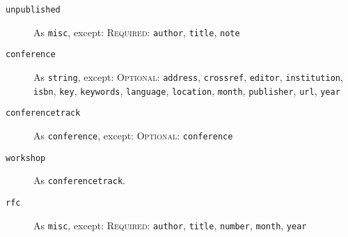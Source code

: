 \documentclass{article}
\begin{document}
\begin{description}
\item[\texttt{unpublished}] As \texttt{misc}, except:
\textsc{Required:} \texttt{author}, \texttt{title}, \texttt{note}

\item[\texttt{conference}] As \texttt{string}, except:
\textsc{Optional:}
\texttt{address},
\texttt{crossref},
\texttt{editor},
\texttt{institution},
\texttt{isbn},
\texttt{key},
\texttt{keywords},
\texttt{language},
\texttt{location},
\texttt{month},
\texttt{publisher},
\texttt{url},
\texttt{year}

\item[\texttt{conferencetrack}] As \texttt{conference}, except:
\textsc{Optional:} \texttt{conference}

\item[\texttt{workshop}] As \texttt{conferencetrack}.

\item[\texttt{rfc}] As \texttt{misc}, except:
\textsc{Required:} \texttt{author}, \texttt{title}, \texttt{number}, \texttt{month}, \texttt{year}

\end{description}
\end{document}
